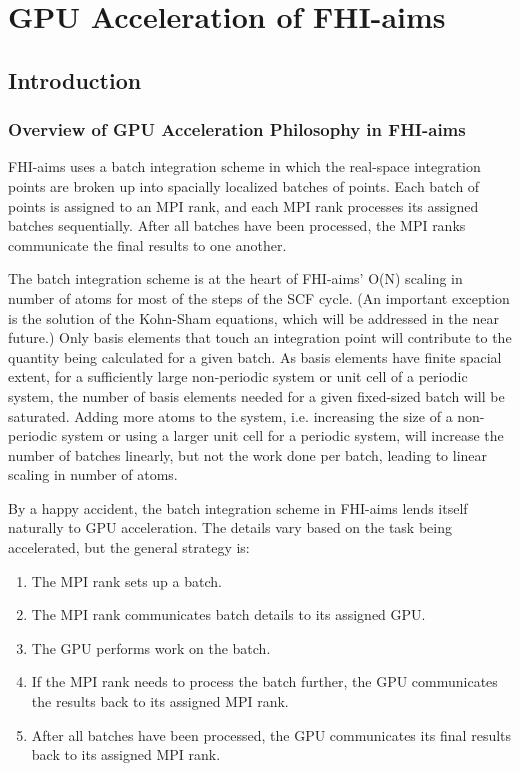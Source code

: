\chapter{GPU Acceleration of FHI-aims}
\label{Sex:appendix_gpu_acceleration}

\section{Introduction}

\subsection{Overview of GPU Acceleration Philosophy in FHI-aims}

FHI-aims uses a batch integration scheme\cite{Havu08} in which the real-space integration points are broken up into spacially localized batches of points. Each batch of points is assigned to an MPI rank, and each MPI rank processes its assigned batches sequentially. After all batches have been processed, the MPI ranks communicate the final results to one another.

The batch integration scheme is at the heart of FHI-aims' O(N) scaling in number of atoms for most of the steps of the SCF cycle. (An important exception is the solution of the Kohn-Sham equations, which will be addressed in the near future.) Only basis elements that touch an integration point will contribute to the quantity being calculated for a given batch. As basis elements have finite spacial extent, for a sufficiently large non-periodic system or unit cell of a periodic system, the number of basis elements needed for a given fixed-sized batch will be saturated. Adding more atoms to the system, i.e. increasing the size of a non-periodic system or using a larger unit cell for a periodic system, will increase the number of batches linearly, but not the work done per batch, leading to linear scaling in number of atoms.

By a happy accident, the batch integration scheme in FHI-aims lends itself naturally to GPU acceleration. The details vary based on the task being accelerated, but the general strategy is:
\begin{enumerate}
\item The MPI rank sets up a batch.
\item The MPI rank communicates batch details to its assigned GPU.
\item The GPU performs work on the batch.
\item If the MPI rank needs to process the batch further, the GPU communicates the results back to its assigned MPI rank.
\item After all batches have been processed, the GPU communicates its final results back to its assigned MPI rank.
\end{enumerate}

